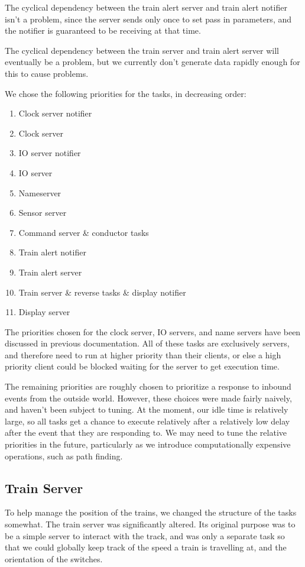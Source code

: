 \documentclass[titlepage]{article}
\begin{document}
The cyclical dependency between the train alert server and train alert notifier
isn't a problem, since the server sends only once to set pass in parameters, and
the notifier is guaranteed to be receiving at that time.

The cyclical dependency between the train server and train alert server will
eventually be a problem, but we currently don't generate data rapidly enough for
this to cause problems.

We chose the following priorities for the tasks, in decreasing order:

\begin{enumerate}
\item Clock server notifier
\item Clock server
\item IO server notifier
\item IO server
\item Nameserver
\item Sensor server
\item Command server \& conductor tasks
\item Train alert notifier
\item Train alert server
\item Train server \& reverse tasks \& display notifier
\item Display server
\end{enumerate}

The priorities chosen for the clock server, IO servers, and name servers have been
discussed in previous documentation.
All of these tasks are exclusively servers, and therefore need to run at higher
priority than their clients, or else a high priority client could be blocked waiting
for the server to get execution time.

The remaining priorities are roughly chosen to prioritize a response to inbound events from
the outside world.
However, these choices were made fairly naively, and haven't been subject to tuning.
At the moment, our idle time is relatively large, so all tasks get a chance to execute
relatively after a relatively low delay after the event that they are responding to.
We may need to tune the relative priorities in the future,
particularly as we introduce computationally expensive operations, such as path finding.

\subsection{Train Server}
To help manage the position of the trains, we changed the structure of the
tasks somewhat.
The train server was significantly altered.
Its original purpose was to be a simple server to interact with the track,
and was only a separate task so that we could globally keep track of the
speed a train is travelling at, and the orientation of the switches.
\end{document}
